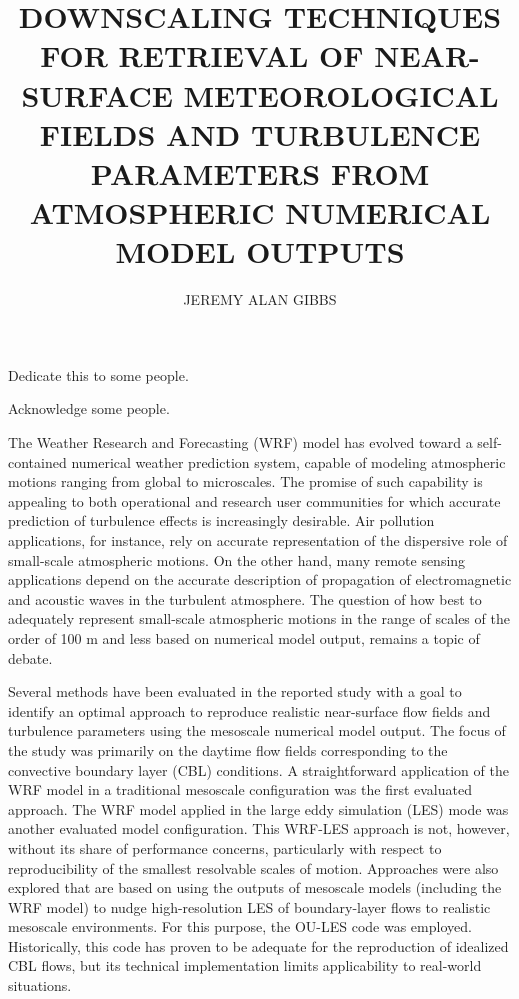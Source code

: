 \documentclass[letter,12pt,dissertation]{OUdissertation6}
\begin{document}
\title{DOWNSCALING TECHNIQUES FOR RETRIEVAL OF NEAR-SURFACE METEOROLOGICAL FIELDS AND TURBULENCE PARAMETERS FROM ATMOSPHERIC NUMERICAL MODEL OUTPUTS}
\author{JEREMY ALAN GIBBS}
\begin{preface}
Dedicate this to some people.

Acknowledge some people.

\tableofcontents
\listoftables
\listoffigures
{}
The Weather Research and Forecasting (WRF) model has evolved toward a self- contained numerical weather prediction system, capable of modeling atmospheric motions ranging from global to microscales. The promise of such capability is appealing to both operational and research user communities for which accurate prediction of turbulence effects is increasingly desirable. Air pollution applications, for instance, rely on accurate representation of the dispersive role of small-scale atmospheric motions. On the other hand, many remote sensing applications depend on the accurate description of propagation of electromagnetic and acoustic waves in the turbulent atmosphere. The question of how best to adequately represent small-scale atmospheric motions in the range of scales of the order of 100 m and less based on numerical model output, remains a topic of debate.

Several methods have been evaluated in the reported study with a goal to identify an optimal approach to reproduce realistic near-surface flow fields and turbulence parameters using the mesoscale numerical model output. The focus of the study was primarily on the daytime flow fields corresponding to the convective boundary layer (CBL) conditions. A straightforward application of the WRF model in a traditional mesoscale configuration was the first evaluated approach. The WRF model applied in the large eddy simulation (LES) mode was another evaluated model configuration. This WRF-LES approach is not, however, without its share of performance concerns, particularly with respect to reproducibility of the smallest resolvable scales of motion. Approaches were also explored that are based on using the outputs of mesoscale models (including the WRF model) to nudge high-resolution LES of boundary-layer flows to realistic mesoscale environments. For this purpose, the OU-LES code was employed. Historically, this code has proven to be adequate for the reproduction of idealized CBL flows, but its technical implementation limits applicability to real-world situations.


\end{preface}
\end{document}

